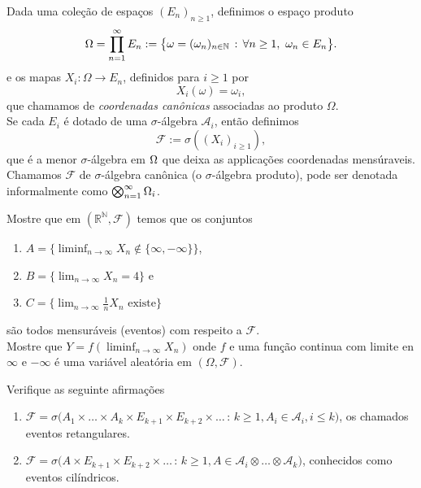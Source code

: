\begin{topics}
\begin{definition}
Dada uma coleção de espaços $(E_n)_{n\ge 1}$, definimos o espaço produto
\begin{equation}
  \Omega = \prod_{n=1}^{\infty} E_n := \big\{\omega=(\omega_n)_{n\in {\ensuremath{\mathbb N}}} \, : \, \forall n\ge 1, \   \omega_n \in E_n \big\}.
\end{equation}
e os mapas $X_i:\Omega \to E_n$, definidos para $i\ge 1$ por
\begin{equation}
  X_i(\omega) = \omega_i,
\end{equation}
que chamamos de \emph{coordenadas canônicas}  associadas ao produto $\Omega$.\\
Se cada $E_i$ é dotado de uma $\sigma$-álgebra $\mathcal{A}_i$, então definimos
\begin{equation}
  \mathcal{F} := \sigma( (X_i)_{i\geq 1} ),
\end{equation}
que é a menor $\sigma$-álgebra em $\Omega$ que deixa as applicações coordenadas mensúraveis.
Chamamos $\mathcal{F}$ de $\sigma$-álgebra canônica (o $\sigma$-álgebra produto), pode ser denotada informalmente como $\bigotimes_{n=1}^{\infty}\Omega_i$.
\end{definition}

\begin{exercise}
  Mostre que em $(\mathbb{R}^{\mathbb{N}},\mathcal{F})$ temos que os conjuntos
  \begin{enumerate}[\quad a)]
  \item $A = \{ \liminf_{n\to \infty} X_n \notin \{\infty,-\infty\} \}$,
  \item $B = \{ \lim_{n\to \infty} X_n = 4\}$ e
  \item $C = \{ \lim_{n\to \infty} \tfrac{1}{n} X_n \text{ existe}\}$
  \end{enumerate}
  são todos mensuráveis (eventos) com respeito a $\mathcal{F}$.\\
  \noindent Mostre que $Y = f(\liminf_{n\to \infty} X_n)$ onde $f$ e uma função continua com limite en $\infty$ e $-\infty$ é uma variável aleatória em $(\Omega, \mathcal{F})$.
\end{exercise}

\begin{exercise}
  Verifique as seguinte afirmações
  \begin{enumerate}[\quad a)]
  \item $\mathcal{F} = \sigma\big(A_1 \times \dots \times A_k \times E_{k+1} \times E_{k+2} \times \dots\, : \, k \geq 1, A_i \in \mathcal{A}_i, i \leq k\big)$,
  os chamados eventos retangulares.
  \item $\mathcal{F} = \sigma\big(A \times E_{k+1} \times E_{k+2} \times \dots\, : \, k \geq 1, A \in \mathcal{A}_i \otimes \dots \otimes \mathcal{A}_k\big)$,
  conhecidos como eventos cilíndricos.
  \end{enumerate}
\end{exercise}




\end{topics}
